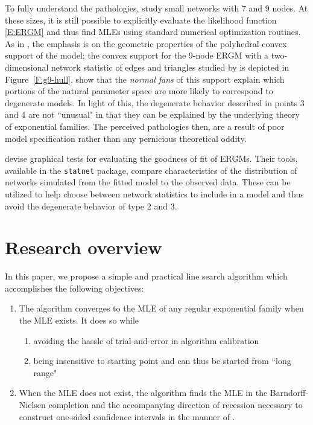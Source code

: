 To fully understand the pathologies, \citeauthor{Handcock:degeneracy,Rinaldo:2009}
study small networks with 7 and 9 nodes.  At these sizes, it is still 
possible to explicitly evaluate the likelihood function \eqref{E:ERGM} and thus 
find MLEs using standard numerical optimization routines.  
As in \citep{Geyer:gdor}, the emphasis is on the geometric properties of the 
polyhedral convex support of the model;
the convex support for the 9-node ERGM with a two-dimensional network statistic of
edges and triangles
studied by \citeauthor{Rinaldo:2009} is depicted in Figure~\ref{F:g9-hull}.
\citeauthor{Rinaldo:2009} show that the \emph{normal fans} of this support 
explain which portions of the natural parameter space are more likely to correspond to 
degenerate models.  In light of this, the degenerate behavior described in 
points 3 and 4 are not ``unusual" in that they can be explained by the underlying
theory of exponential families.  The perceived pathologies then, are a result of 
poor model specification rather than any pernicious theoretical oddity.

\citet*{GOF} devise graphical tests for evaluating the goodness of fit of ERGMs.
Their tools, available in the \texttt{statnet} package, compare characteristics of 
the distribution of networks simulated from the fitted model to the observed data.
These can be utilized to help choose between network statistics to include in a 
model and thus avoid the degenerate behavior of type 2 and 3. 

%


\section{Research overview} 
In this paper, we propose a simple and practical line search algorithm which
accomplishes the following objectives:
\begin{enumerate}
\item The algorithm converges to the MLE of any regular exponential family 
when the MLE exists.  It does so while
\begin{enumerate}
	\item avoiding the hassle of trial-and-error in algorithm calibration
	\item being insensitive to starting point and can thus be started from ``long range"
\end{enumerate}
\item When the MLE does not exist, the algorithm finds the MLE in the Barndorff-Nielsen completion and the 
accompanying direction of recession necessary to construct one-sided 
confidence intervals in the manner of \citep{Geyer:gdor}.
\end{enumerate}

